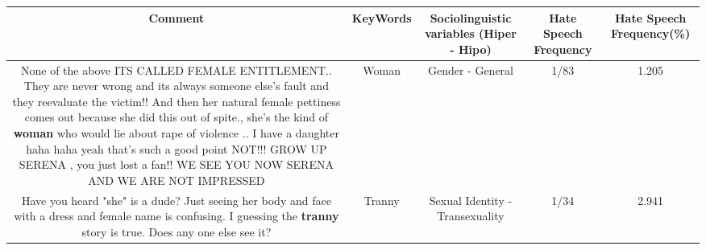 \documentclass[11pt]{article}
\newlength\mylength
\begin{document}
\begin{center}
\setlength\mylength{\dimexpr\textwidth - 1\arrayrulewidth - 50\tabcolsep}
\begin{longtable}{|C{.65\mylength}|C{.30\mylength}|C{.12\mylength}|C{.12\mylength}|C{.12\mylength}|}
\hline
\textbf{Comment} & \textbf{KeyWords} & \textbf{Sociolinguistic variables (Hiper - Hipo)}  & \textbf{Hate Speech Frequency} & \textbf{Hate Speech Frequency(\%)} \\
\hline{}\small None of the above ITS CALLED FEMALE ENTITLEMENT..   They are never wrong and its always someone else's fault and they reevaluate the victim!! And then her natural female pettiness comes out because she did this out of spite.,   she's the kind of \textbf{woman} who  would lie about rape of violence ..  I have a daughter haha haha yeah that's such a good point NOT!!!  GROW UP SERENA , you just lost a fan!! WE SEE YOU NOW SERENA  AND WE ARE NOT IMPRESSED\normalsize   & Woman & Gender - General & 1/83 & 1.205 \\  \hline
  \small Have you heard "she" is a dude? Just seeing her body and face with a dress and female name is confusing. I guessing the \textbf{tranny} story is true. Does any one else see it?\normalsize   & Tranny & Sexual Identity - Transexuality & 1/34 & 2.941 \\  \hline

\end{longtable}
\end{center}
\end{document}
